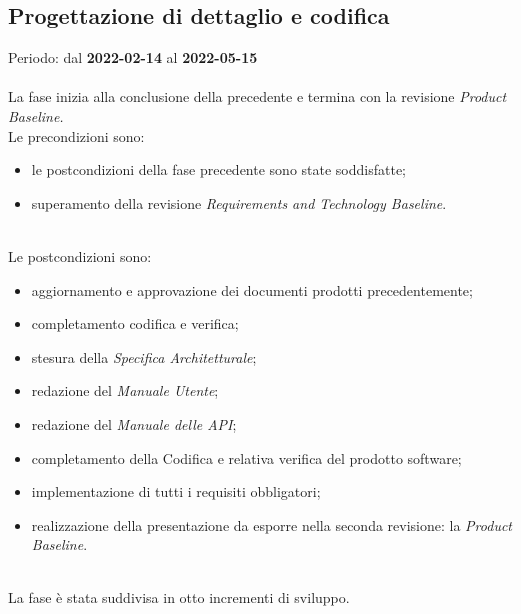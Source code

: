 \subsection{Progettazione di dettaglio e codifica}
Periodo: dal \textbf{2022-02-14} al \textbf{2022-05-15} \mbox{} \\ \mbox{} \\
La fase inizia alla conclusione della precedente e termina con la revisione \textit{Product Baseline.} \mbox{} \\
Le precondizioni sono:
\begin{itemize}
	\item le postcondizioni della fase precedente sono state soddisfatte;
 	\item superamento della revisione \textit{Requirements and Technology Baseline}.
\end{itemize} \mbox{} \\
Le postcondizioni sono:
\begin{itemize}
	\item aggiornamento e approvazione dei documenti prodotti precedentemente;
	\item completamento codifica e verifica;
	\item stesura della \textit{Specifica Architetturale};
	\item redazione del \textit{Manuale Utente};
 	\item redazione del \textit{Manuale delle API};
    \item completamento della Codifica e relativa verifica del prodotto software;
    \item implementazione di tutti i requisiti obbligatori;
	\item realizzazione della presentazione da esporre nella seconda revisione: la \textit{Product Baseline}\glo{}. 
\end{itemize} \mbox{} \\
La fase è stata suddivisa in otto incrementi di sviluppo.

\pagebreak

